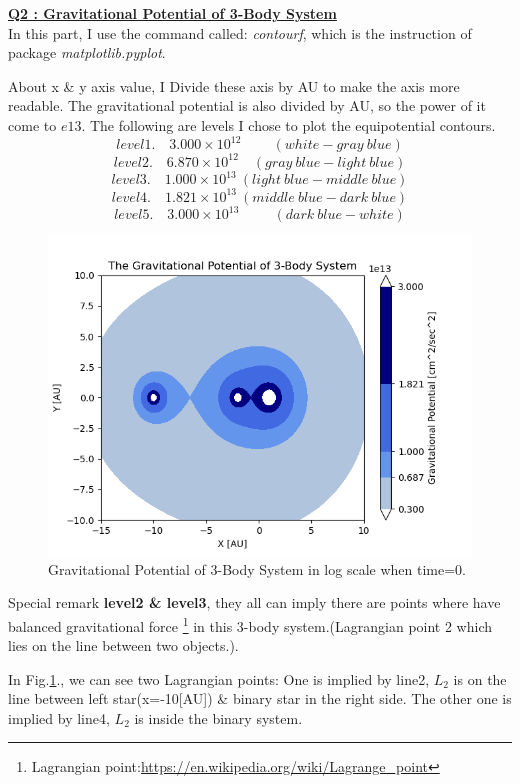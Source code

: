 \documentclass{article}
\begin{document}
\underline{\textbf{Q2 : Gravitational Potential of 3-Body System}}\\
In this part, I use the command called: \emph{contourf}, which is the instruction of package \emph{matplotlib.pyplot}.

About x \& y axis value, I Divide these axis by AU to make the axis more readable. The gravitational potential is also divided by AU, so the power of it come to $e13$.
The following are levels I chose to plot the equipotential contours.
$$ level1.\quad3.000\times10^{12} \qquad\ (white-gray\ blue) $$
$$ level2.\quad6.870\times10^{12} \quad (gray\ blue-light\ blue)  $$
$$ level3.\quad1.000\times10^{13} \ (light\ blue-middle\ blue) $$
$$ level4.\quad1.821\times10^{13} \ (middle\ blue-dark\ blue)$$
$$ level5.\quad3.000\times10^{13} \qquad\ \ (dark\ blue-white)$$
\begin{figure}[h]
    \centering 
	\includegraphics[scale=0.62]{Potential.png}
	\caption{Gravitational Potential of 3-Body System in log scale when time=0.} %
	\label{fig.pro2} %
\end{figure}

Special remark \textbf{level2 \& level3},
they all can imply there are points where have balanced gravitational force
\footnote{Lagrangian point:\href{https://en.wikipedia.org/wiki/Lagrange\_point}{https://en.wikipedia.org/wiki/Lagrange\_point}}
in this 3-body system.(Lagrangian point 2 which lies on the line between two objects.).

In Fig.\ref{fig.pro2}., we can see two Lagrangian points: One is implied by line2, $L_2$ is on the line between left star(x=-10[AU]) \& binary star in the right side. The other one is implied by line4, $L_2$ is inside the binary system.
\end{document}

